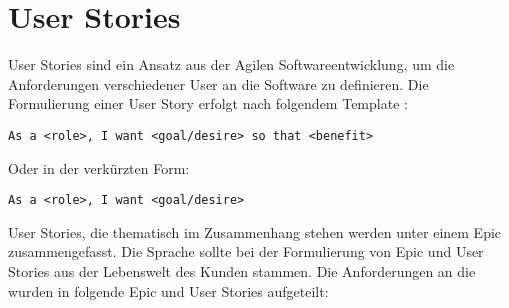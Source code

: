 \section{User Stories}
User Stories sind ein Ansatz aus der Agilen Softwareentwicklung, um die Anforderungen verschiedener User an die Software zu definieren. Die
Formulierung einer User Story erfolgt nach folgendem Template \cite{Wikipedia_User_Story}:
\begin{lstlisting}
As a <role>, I want <goal/desire> so that <benefit>
\end{lstlisting}
Oder in der verkürzten Form:
\begin{lstlisting}
As a <role>, I want <goal/desire>
\end{lstlisting}
User Stories, die thematisch im Zusammenhang stehen werden unter einem Epic zusammengefasst. Die Sprache sollte bei der Formulierung
 von Epic und User Stories aus der Lebenswelt des Kunden stammen. Die Anforderungen an die \EBP wurden in folgende Epic und User Stories aufgeteilt:
\newline


